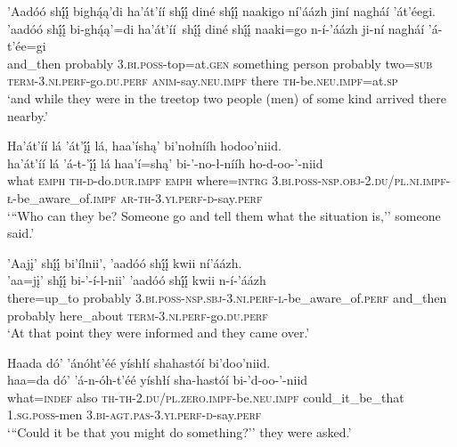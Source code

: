 \ea\label{ex:text4-2-21}
’Aadóó shį́į́ bighą́ą’di ha’át’íí shį́į́ diné shį́į́ naakigo ní’áázh jiní nagháí ’át’éegi.\\
\gll ’aadóó	shį́į́	bi-ghą́ą’=di	ha’át’íí~{shį́į́}	diné	shį́į́	naaki=go	n-í-’áázh	ji-ní	nagháí	’á-t’ée=gi\\
     and\_then	probably	3.\textsc{bi}.\textsc{poss}-top=at.\textsc{gen}	something	person	probably	two=\textsc{sub}	\textsc{term}-3.\textsc{ni}.\textsc{perf}-go.\textsc{du}.\textsc{perf}	\textsc{anim}-say.\textsc{neu}.\textsc{impf}	there	\textsc{th}-be.\textsc{neu}.\textsc{impf}=at.\textsc{sp}\\
\glt `and while they were in the treetop two people (men) of some kind arrived there nearby.'
\z

\newpage
\ea\label{ex:text4-2-22}
Ha’át’íí lá ’át’į́į́ lá, haa’íshą’ bi’nołnííh hodoo’niid.\\
\gll ha’át’íí	lá	’á-t-’į́į́	lá	haa’í=shą’	bi-’-no-ł-nííh	ho-d-oo-’-niid\\
     what	\textsc{emph}	\textsc{th}-\textsc{d}-do.\textsc{dur}.\textsc{impf}	\textsc{emph}	where=\textsc{intrg}	3.\textsc{bi}.\textsc{poss}-\textsc{nsp}.\textsc{obj}-2.\textsc{du}/\textsc{pl}.\textsc{ni}.\textsc{impf}-\textsc{ł}-be\_aware\_of.\textsc{impf}	\textsc{ar}-\textsc{th}-3.\textsc{yi}.\textsc{perf}-\textsc{d}-say.\textsc{perf}\\
\glt `{``}Who can they be? Someone go and tell them what the situation is,'' someone said.'
\z

\ea\label{ex:text4-2-23}
’Aajį’ shį́į́ bi’ílnii’, ’aadóó shį́į́ kwii ní’áázh.\\
\gll ’aa=jį’	shį́į́	bi-’-í-l-nii’	’aadóó	shį́į́	kwii	n-í-’áázh\\
     there=up\_to	probably	3.\textsc{bi}.\textsc{poss}-\textsc{nsp}.\textsc{sbj}-3.\textsc{ni}.\textsc{perf}-\textsc{l}-be\_aware\_of.\textsc{perf}	and\_then	probably	here\_about	\textsc{term}-3.\textsc{ni}.\textsc{perf}-go.\textsc{du}.\textsc{perf}\\
\glt `At that point they were informed and they came over.'
\z

\ea\label{ex:text4-2-24}
Haada dó’ ’ánóht’éé yíshłí shahastóí bi’doo’niid.\\
\gll haa=da	dó’	’á-n-óh-t’éé	yíshłí	sha-hastóí	bi-’d-oo-’-niid\\
     what=\textsc{indef}	also	\textsc{th}-\textsc{th}-2.\textsc{du}/\textsc{pl}.\textsc{zero}.\textsc{impf}-be.\textsc{neu}.\textsc{impf}	could\_it\_be\_that	1.\textsc{sg}.\textsc{poss}-men	3.\textsc{bi}-\textsc{agt}.\textsc{pas}-3.\textsc{yi}.\textsc{perf}-\textsc{d}-say.\textsc{perf}\\
\glt `{``}Could it be that you might do something?'' they were asked.'
\z

